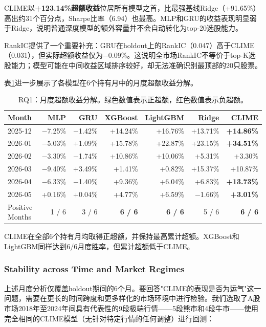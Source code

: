 CLIME以\textbf{+123.14\%超额收益}位居所有模型之首，比最强基线Ridge（+91.65\%）高出约31个百分点，Sharpe比率（6.94）也最高。MLP和GRU的收益表现明显弱于Ridge，说明普通深度模型的额外容量并不会自动转化为top-20选股能力。

RankIC提供了一个重要补充：GRU在holdout上的RankIC（0.047）高于CLIME（0.031），但实际超额收益仅为$-$0.09\%。这说明全市场RankIC不等价于top-K选股能力；模型可能在中间收益区域排序较好，却无法准确识别最顶部的20只股票。

表\ref{tab:rq1_monthly}进一步展示了各模型在6个持有月中的月度超额收益分解。

\begin{table}[H]
\centering
\caption{RQ1：月度超额收益分解。绿色数值表示正超额，红色数值表示负超额。}
\label{tab:rq1_monthly}
\begin{tabular}{@{}lrrrrrr@{}}
\toprule
Month & MLP & GRU & XGBoost & LightGBM & Ridge & CLIME \\
\midrule
2025-12 & $-$7.25\% & $-$1.42\% & +14.24\% & +16.76\% & +13.71\% & \textbf{+14.86\%} \\
2026-01 & $-$5.03\% & +1.09\%  & +15.78\% & +22.87\% & +23.15\% & \textbf{+34.51\%} \\
2026-02 & $-$3.30\% & $-$1.74\% & +10.86\% & +10.06\% & +5.31\%  & +3.30\% \\
2026-03 & $-$9.40\% & +3.49\%  & +1.41\%  & +0.82\%  & +15.37\% & +10.87\% \\
2026-04 & $-$6.33\% & $-$1.40\% & +9.36\%  & +6.04\%  & +6.83\%  & \textbf{+13.73\%} \\
2026-05 & +0.16\%  & +0.04\%  & +4.77\%  & +6.59\%  & $-$1.66\% & \textbf{+3.01\%} \\
\midrule
Positive Months & 1 / 6 & 3 / 6 & \textbf{6 / 6} & \textbf{6 / 6} & 5 / 6 & \textbf{6 / 6} \\
\bottomrule
\end{tabular}
\end{table}

CLIME在全部6个持有月均取得正超额，并保持最高累计超额。XGBoost和LightGBM同样达到6/6月度胜率，但累计超额低于CLIME。

\subsubsection{Stability across Time and Market Regimes}

上述月度分析仅覆盖holdout期间的6个月。要回答"CLIME的表现是否为运气"这一问题，需要在更长的时间跨度和更多样化的市场环境中进行检验。我们选取了A股市场2018年至2024年间具有代表性的9段极端行情——5段熊市和4段牛市——使用完全相同的CLIME模型（无针对特定行情的任何调整）进行回测：

